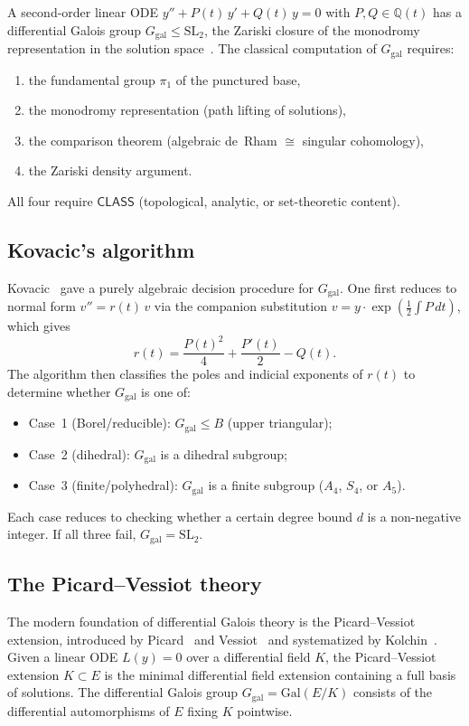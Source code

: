 \documentclass[11pt]{article}
\theoremstyle{plain}
\theoremstyle{definition}
\theoremstyle{remark}
\newcommand{\Q}{\mathbb{Q}}
\newcommand{\Gal}{\mathrm{Gal}}
\newcommand{\SL}{\mathrm{SL}}
\newcommand{\Ggal}{G_{\mathrm{gal}}}
\newcommand{\CLASS}{\mathsf{CLASS}}
\begin{document}
A second-order linear ODE $y'' + P(t)\,y' + Q(t)\,y = 0$ with $P, Q \in \Q(t)$ has a differential Galois group $\Ggal \leq \SL_2$, the Zariski closure of the monodromy representation in the solution space~\cite{Singer2009,Put2003}.
The classical computation of $\Ggal$ requires:
\begin{enumerate}[label=(\alph*)]
  \item the fundamental group $\pi_1$ of the punctured base,
  \item the monodromy representation (path lifting of solutions),
  \item the comparison theorem (algebraic de~Rham $\cong$ singular cohomology),
  \item the Zariski density argument.
\end{enumerate}
All four require $\CLASS$ (topological, analytic, or set-theoretic content).

\subsection{Kovacic's algorithm}

Kovacic~\cite{Kovacic1986} gave a purely algebraic decision procedure for $\Ggal$.
One first reduces to normal form $v'' = r(t)\,v$ via the companion substitution $v = y \cdot \exp(\frac{1}{2}\int P\,dt)$, which gives
\begin{equation}\label{eq:rtransform}
  r(t) = \frac{P(t)^2}{4} + \frac{P'(t)}{2} - Q(t).
\end{equation}
The algorithm then classifies the poles and indicial exponents of $r(t)$ to determine whether $\Ggal$ is one of:
\begin{itemize}
  \item Case~1 (Borel/reducible): $\Ggal \leq B$ (upper triangular);
  \item Case~2 (dihedral): $\Ggal$ is a dihedral subgroup;
  \item Case~3 (finite/polyhedral): $\Ggal$ is a finite subgroup ($A_4$, $S_4$, or $A_5$).
\end{itemize}
Each case reduces to checking whether a certain degree bound $d$ is a non-negative integer.
If all three fail, $\Ggal = \SL_2$.

\subsection{The Picard--Vessiot theory}

The modern foundation of differential Galois theory is the Picard--Vessiot extension, introduced by Picard~\cite{Picard1896} and Vessiot~\cite{Vessiot1892} and systematized by Kolchin~\cite{Kolchin1948}.
Given a linear ODE $L(y) = 0$ over a differential field $K$, the Picard--Vessiot extension $K \subset E$ is the minimal differential field extension containing a full basis of solutions.
The differential Galois group $\Ggal = \Gal(E/K)$ consists of the differential automorphisms of $E$ fixing $K$ pointwise.
\end{document}
